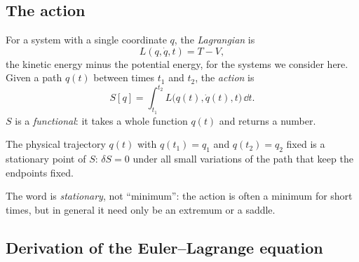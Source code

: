 \documentclass[11pt]{article}
\begin{document}
\subsection{The action}

For a system with a single coordinate $q$, the \emph{Lagrangian} is
\begin{equation}
  L(q,\dot q,t)=T-V,
\end{equation}
the kinetic energy minus the potential energy, for the systems we consider here. Given a path $q(t)$ between times $t_1$ and $t_2$, the \emph{action} is
\begin{equation}
  S[q]=\int_{t_1}^{t_2} L\bigl(q(t),\dot q(t),t\bigr)\,\dd t.
\end{equation}
$S$ is a \emph{functional}: it takes a whole function $q(t)$ and returns a number.

\begin{theorem}
The physical trajectory $q(t)$ with $q(t_1)=q_1$ and $q(t_2)=q_2$ fixed is a stationary point of $S$: $\delta S=0$ under all small variations of the path that keep the endpoints fixed.
\end{theorem}

The word is \emph{stationary}, not ``minimum'': the action is often a minimum for short times, but in general it need only be an extremum or a saddle.

\subsection{Derivation of the Euler--Lagrange equation}
\end{document}
